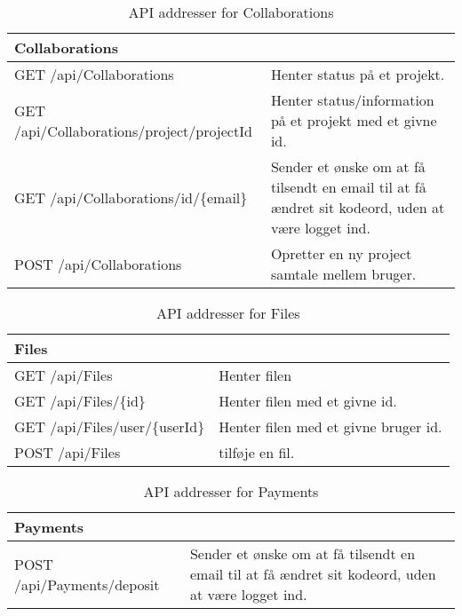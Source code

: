 \begin{table}[H]
	\centering
	\caption{API addresser for Collaborations}
	\label{tab:web_user}
	\begin{tabular}{p{5cm}|p{11cm}}
		\hline
		\multicolumn{2}{l}{\textbf{Collaborations}}\\
		\hline
		GET \newline
		/api/Collaborations &
		Henter status på et projekt. \\
		\hline
        GET \newline
		/api/Collaborations/project/{projectId} &
		Henter status/information på et projekt med et givne id. \\
		\hline
		GET \newline
		/api/Collaborations/{id}/\{email\} &
		Sender et ønske om at få tilsendt en email til at få ændret sit kodeord, uden at være logget ind.
		\\
		\hline
		POST \newline
		/api/Collaborations &
		Opretter en ny project samtale mellem bruger. \\
		\hline
	
	\end{tabular}
\end{table}

\begin{table}[H]
	\centering
	\caption{API addresser for Files}
	\label{tab:web_user}
	\begin{tabular}{p{5cm}|p{11cm}}
		\hline
		\multicolumn{2}{l}{\textbf{Files}}\\
		\hline
		GET \newline
		/api/Files &
		Henter filen  \\
        \hline
        GET \newline
		/api/Files/\{id\} &
		Henter filen med et givne id. \\
        \hline
        GET \newline
		/api/Files/user/\{userId\} &
		Henter filen med et givne bruger id. \\
		\hline
		POST \newline
		/api/Files &
		tilføje en fil. \\
		\hline
	
	\end{tabular}
\end{table}

\begin{table}[H]
	\centering
	\caption{API addresser for Payments}
	\label{tab:web_user}
	\begin{tabular}{p{5cm}|p{11cm}}
		\hline
		\multicolumn{2}{l}{\textbf{Payments}}\\
		\hline
		POST \newline
		/api/Payments/deposit &
		Sender et ønske om at få tilsendt en email til at få ændret sit kodeord, uden at være logget ind. 
		\\
		\hline
	\end{tabular}
\end{table}

